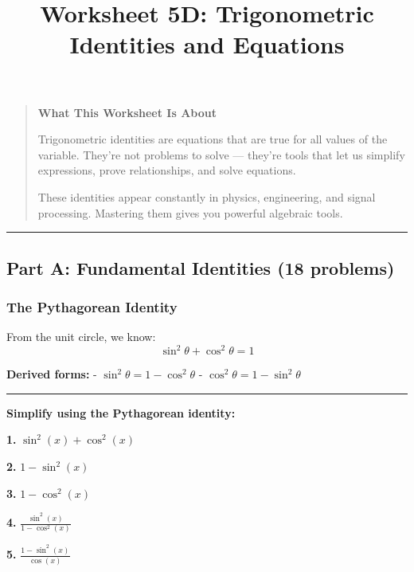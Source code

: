 \documentclass[
  11pt,
]{article}
\title{Worksheet 5D: Trigonometric Identities and Equations}
\author{}
\date{}
\begin{document}
\maketitle

\begin{quote}
\textbf{What This Worksheet Is About}

Trigonometric identities are equations that are true for all values of
the variable. They're not problems to solve --- they're tools that let
us simplify expressions, prove relationships, and solve equations.

These identities appear constantly in physics, engineering, and signal
processing. Mastering them gives you powerful algebraic tools.
\end{quote}

\begin{center}\rule{0.5\linewidth}{0.5pt}\end{center}

\hypertarget{part-a-fundamental-identities-18-problems}{%
\subsection{Part A: Fundamental Identities (18
problems)}\label{part-a-fundamental-identities-18-problems}}

\hypertarget{the-pythagorean-identity}{%
\subsubsection{The Pythagorean
Identity}\label{the-pythagorean-identity}}

From the unit circle, we know:
\[\boxed{\sin^2\theta + \cos^2\theta = 1}\]

\textbf{Derived forms:} - \(\sin^2\theta = 1 - \cos^2\theta\) -
\(\cos^2\theta = 1 - \sin^2\theta\)

\begin{center}\rule{0.5\linewidth}{0.5pt}\end{center}

\textbf{Simplify using the Pythagorean identity:}

\textbf{1.} \(\sin^2(x) + \cos^2(x)\)

\textbf{2.} \(1 - \sin^2(x)\)

\textbf{3.} \(1 - \cos^2(x)\)

\textbf{4.} \(\frac{\sin^2(x)}{1 - \cos^2(x)}\)

\textbf{5.} \(\frac{1 - \sin^2(x)}{\cos(x)}\)
\end{document}
